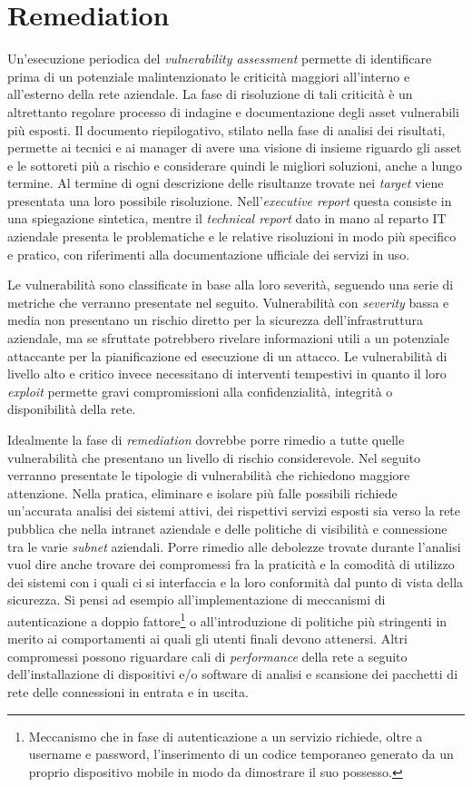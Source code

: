 \documentclass[target=mst,aauheader=]{thud}
\begin{document}
\section{Remediation}

Un’esecuzione periodica del \textit{vulnerability assessment} permette di identificare prima di un potenziale malintenzionato le criticità maggiori all’interno e all’esterno della rete aziendale. La fase di risoluzione di tali criticità è un altrettanto regolare processo di indagine e documentazione degli asset vulnerabili più esposti. Il documento riepilogativo, stilato nella fase di analisi dei risultati, permette ai tecnici e ai manager di avere una visione di insieme riguardo gli asset e le sottoreti più a rischio e considerare quindi le migliori soluzioni, anche a lungo termine. Al termine di ogni descrizione delle risultanze trovate nei \textit{target} viene presentata una loro possibile risoluzione. Nell’\textit{executive report} questa consiste in una spiegazione sintetica, mentre il \textit{technical report} dato in mano al reparto IT aziendale presenta le problematiche e le relative risoluzioni in modo più specifico e pratico, con riferimenti alla documentazione ufficiale dei servizi in uso.

Le vulnerabilità sono classificate in base alla loro severità, seguendo una serie di metriche che verranno presentate nel seguito. Vulnerabilità con \textit{severity} bassa e media non presentano un rischio diretto per la sicurezza dell’infrastruttura aziendale, ma se sfruttate potrebbero rivelare informazioni utili a un potenziale attaccante per la pianificazione ed esecuzione di un attacco. Le vulnerabilità di livello alto e critico invece necessitano di interventi tempestivi in quanto il loro \textit{exploit} permette gravi compromissioni alla confidenzialità, integrità o disponibilità della rete.

Idealmente la fase di \textit{remediation} dovrebbe porre rimedio a tutte quelle vulnerabilità che presentano un livello di rischio considerevole. Nel seguito verranno presentate le tipologie di vulnerabilità che richiedono maggiore attenzione. Nella pratica, eliminare e isolare più falle possibili richiede un’accurata analisi dei sistemi attivi, dei rispettivi servizi esposti sia verso la rete pubblica che nella intranet aziendale e delle politiche di visibilità e connessione tra le varie \textit{subnet} aziendali. Porre rimedio alle debolezze trovate durante l’analisi vuol dire anche trovare dei compromessi fra la praticità e la comodità di utilizzo dei sistemi con i quali ci si interfaccia e la loro conformità dal punto di vista della sicurezza. Si pensi ad esempio all’implementazione di meccanismi di autenticazione a doppio fattore\footnote{Meccanismo che in fase di autenticazione a un servizio richiede, oltre a username e password, l'inserimento di un codice temporaneo generato da un proprio dispositivo mobile in modo da dimostrare il suo possesso.} o all’introduzione di politiche più stringenti in merito ai comportamenti ai quali gli utenti finali devono attenersi. Altri compromessi possono riguardare cali di \textit{performance} della rete a seguito dell’installazione di dispositivi e/o software di analisi e scansione dei pacchetti di rete delle connessioni in entrata e in uscita.
\end{document}
